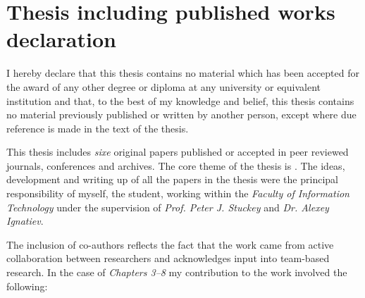 \section*{Thesis including published works declaration}



I hereby declare that this thesis contains no material which has been accepted for the award of any other degree or diploma at any university or equivalent institution and that, to the best of my knowledge and belief, this thesis contains no material previously published or written by another person, except where due reference is made in the text of the
thesis.

This thesis includes \emph{sixe} original papers published or accepted in peer reviewed journals, conferences
and archives. %
%
The core theme of the thesis is \emph{\thesistopic}.
%
The ideas, development and writing up of all the papers in the thesis were the principal responsibility of myself, the student, working within the
\emph{Faculty of Information Technology} under the  supervision of \emph{Prof. Peter J. Stuckey}
and \emph{Dr. Alexey Ignatiev}.

The inclusion of co-authors reflects the fact that the work came from active collaboration between researchers and acknowledges input into team-based research.
%
In the case of \emph{Chapters 3--8} my contribution to the work involved the following:


